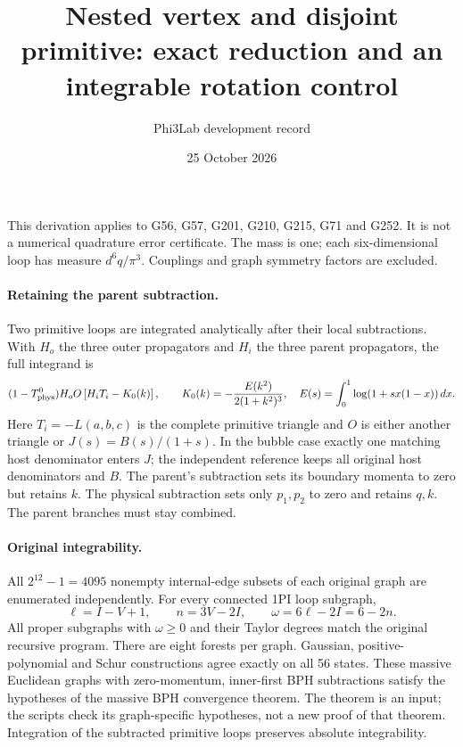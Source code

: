\documentclass[11pt]{article}
\title{Nested vertex and disjoint primitive: exact reduction and an integrable rotation control}
\author{Phi3Lab development record}\date{25 October 2026}
\begin{document}
\maketitle
\noindent This derivation applies to G56, G57, G201, G210, G215, G71 and G252. It is not a numerical quadrature error certificate. The mass is one; each six-dimensional loop has measure $d^6q/\pi^3$. Couplings and graph symmetry factors are excluded.
\paragraph{Retaining the parent subtraction.}
Two primitive loops are integrated analytically after their local subtractions. With $H_o$ the three outer propagators and $H_i$ the three parent propagators, the full integrand is
\[
(1-T^0_{\rm phys})H_o O\left[H_iT_i-K_0(k)\right],\qquad
K_0(k)=-\frac{E(k^2)}{2(1+k^2)^3},\quad E(s)=\int_0^1\log(1+sx(1-x))\,dx.
\]
Here $T_i=-L(a,b,c)$ is the complete primitive triangle and $O$ is either another triangle or $J(s)=B(s)/(1+s)$. In the bubble case exactly one matching host denominator enters $J$; the independent reference keeps all original host denominators and $B$.
The parent's subtraction sets its boundary momenta to zero but retains $k$. The physical subtraction sets only $p_1,p_2$ to zero and retains $q,k$. The parent branches must stay combined.
\paragraph{Original integrability.}
All $2^{12}-1=4095$ nonempty internal-edge subsets of each original graph are enumerated independently. For every connected 1PI loop subgraph,
\[
\ell=I-V+1,\qquad n=3V-2I,\qquad \omega=6\ell-2I=6-2n.
\]
All proper subgraphs with $\omega\ge0$ and their Taylor degrees match the original recursive program. There are eight forests per graph. Gaussian, positive-polynomial and Schur constructions agree exactly on all 56 states. These massive Euclidean graphs with zero-momentum, inner-first BPH subtractions satisfy the hypotheses of the massive BPH convergence theorem. The theorem is an input; the scripts check its graph-specific hypotheses, not a new proof of that theorem. Integration of the subtracted primitive loops preserves absolute integrability.
\end{document}
